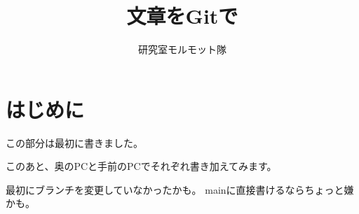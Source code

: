 \documentclass[a4j]{ujarticle}
\title{文章をGitで}
\author{研究室モルモット隊}
\begin{document}
\maketitle
\tableofcontents

\section{はじめに}
この部分は最初に書きました。

このあと、奥のPCと手前のPCでそれぞれ書き加えてみます。

最初にブランチを変更していなかったかも。
mainに直接書けるならちょっと嫌かも。
\end{document}
